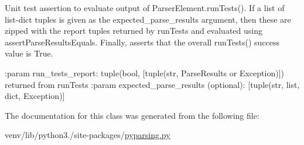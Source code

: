 \begin{DoxyVerb}Unit test assertion to evaluate output of ParserElement.runTests(). If a list of
list-dict tuples is given as the expected_parse_results argument, then these are zipped
with the report tuples returned by runTests and evaluated using assertParseResultsEquals.
Finally, asserts that the overall runTests() success value is True.

:param run_tests_report: tuple(bool, [tuple(str, ParseResults or Exception)]) returned from runTests
:param expected_parse_results (optional): [tuple(str, list, dict, Exception)]
\end{DoxyVerb}
 

The documentation for this class was generated from the following file\+:\begin{DoxyCompactItemize}
\item 
venv/lib/python3./site-\/packages/\hyperlink{pyparsing_8py}{pyparsing.\+py}\end{DoxyCompactItemize}
